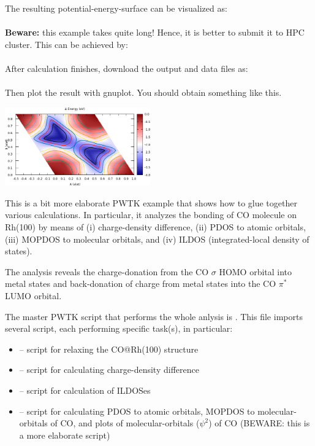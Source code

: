 \documentclass[landscape]{foils}
\begin{document}
The resulting potential-energy-surface can be visualized as:\\
\\[0.5em]
{\bf Beware:} this example takes quite long! Hence, it is better to
submit it to HPC cluster. This can be achieved by:\\
\\[0.5em]
After calculation finishes, download the output and data files as:\\
\\[0.5em]
Then plot the result with gnuplot. You should obtain something like
this.
\centerline{\includegraphics[width=0.47\textwidth]{figs/PES-2D.png}}



This is a bit more elaborate PWTK example that shows how to glue
together various calculations. In particular, it analyzes the bonding
of CO molecule on Rh(100) by means of (i) charge-density difference,
(ii) PDOS to atomic orbitals, (iii) MOPDOS to molecular orbitals, and
(iv) ILDOS (integrated-local density of states).

The analysis reveals the charge-donation from the CO $\sigma$ HOMO
orbital into metal states and back-donation of charge from metal
states into the CO $\pi^*$ LUMO orbital.

The master PWTK script that performs the whole anlysis is
. This file imports several script, each performing
specific task(s), in particular:

\begin{itemize}
\vspace{-0.5em}
\item {} -- script for relaxing the CO@Rh(100)
  structure
\vspace{-0.5em}
\item {} -- script for calculating charge-density
  difference
\vspace{-0.5em}
\item {} -- script for calculation of ILDOSes
\vspace{-0.5em}
\item {} -- script for calculating PDOS to atomic
  orbitals, MOPDOS to molecular-orbitals of CO, and plots of
  molecular-orbitals ($\psi^2$) of CO (BEWARE: this is a more
  elaborate script)
\end{itemize}
\end{document}
